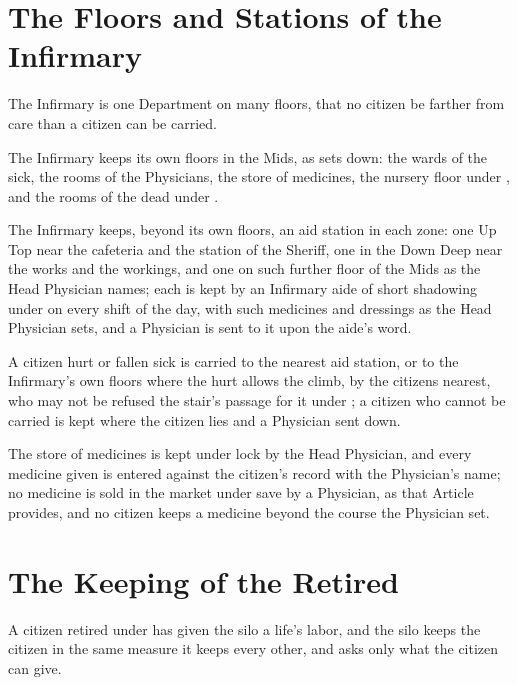 \section{The Floors and Stations of the Infirmary}
\label{sec:health:floors-and-stations-of-the-infirmary}

The Infirmary is one Department on many floors, that no citizen be farther from care than a citizen can be carried.

\begin{clauses}
\item The Infirmary keeps its own floors in the Mids, as  sets down: the wards of the sick, the rooms of the Physicians, the store of medicines, the nursery floor under , and the rooms of the dead under .
\item The Infirmary keeps, beyond its own floors, an aid station in each zone: one Up Top near the cafeteria and the station of the Sheriff, one in the Down Deep near the works and the workings, and one on such further floor of the Mids as the Head Physician names; each is kept by an Infirmary aide of short shadowing under  on every shift of the day, with such medicines and dressings as the Head Physician sets, and a Physician is sent to it upon the aide's word.
\item A citizen hurt or fallen sick is carried to the nearest aid station, or to the Infirmary's own floors where the hurt allows the climb, by the citizens nearest, who may not be refused the stair's passage for it under ; a citizen who cannot be carried is kept where the citizen lies and a Physician sent down.
\item The store of medicines is kept under lock by the Head Physician, and every medicine given is entered against the citizen's record with the Physician's name; no medicine is sold in the market under  save by a Physician, as that Article provides, and no citizen keeps a medicine beyond the course the Physician set.
\end{clauses}

\section{The Keeping of the Retired}
\label{sec:health:keeping-of-the-retired}

A citizen retired under  has given the silo a life's labor, and the silo keeps the citizen in the same measure it keeps every other, and asks only what the citizen can give.

